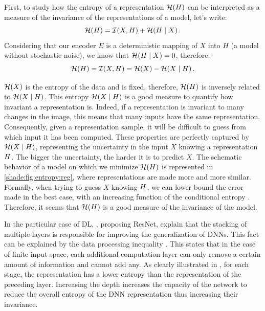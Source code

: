         First, to study how the entropy of a representation $\mathcal{H}(H)$ can be interpreted as a measure of the invariance of the representations of a model, let's write:
        \begin{equation}
            \mathcal{H}(H) = \mathcal{I}(X,H) + {\mathcal{H}(H \mid X)} \,.
        \end{equation}
        Considering that our encoder $E$ is a deterministic mapping of $X$ into $H$ (\ie a model without stochastic noise), we know that $\mathcal{H}(H\mid X)=0$, therefore:
        \begin{equation}
            \mathcal{H}(H) = \mathcal{I}(X, H) = \mathcal{H}(X) - \mathcal{H}(X \mid H)\,.
        \end{equation}
        
        $\mathcal{H}(X)$ is the entropy of the data and is fixed, therefore, $\mathcal{H}(H)$ is inversely related to $\mathcal{H}(X\mid H)$. This entropy $\mathcal{H}(X\mid H)$ is a good measure to quantify how invariant a representation is. Indeed, if a representation is invariant to many changes in the image, this means that many inputs have the same representation. Consequently, given a representation sample, it will be difficult to guess from which input it has been computed. These properties are perfectly captured by $\mathcal{H}(X\mid H)$, representing the uncertainty in the input $X$ knowing a representation $H$. The bigger the uncertainty, the harder it is to predict $X$. The schematic behavior of a model on which we minimize $\mathcal{H}(H)$ is represented in \autoref{shade:fig:entropy:reg}, where representations are made more and more similar. Formally, when trying to guess $X$ knowing $H$, we can lower bound the error made in the best case, with an increasing function of the conditional entropy \citep[Appendix D]{Blot2018full}. %
        Therefore, it seems that $\mathcal{H}(H)$ is a good measure of the invariance of the model.
        
        In the particular case of \acf{DL}, \citet{resnet}, proposing ResNet, explain that the stacking of multiple layers is responsible for improving the generalization of \acp{DNN}. This fact can be explained by the data processing inequality \citep{element}. This states that in the case of finite input space, each additional computation layer can only remove a certain amount of information and cannot add any. As clearly illustrated in \citet{IBdeep}, for each stage, the representation has a lower entropy than the representation of the preceding layer. Increasing the depth increases the capacity of the network to reduce the overall entropy of the \ac{DNN} representation thus increasing their invariance.

